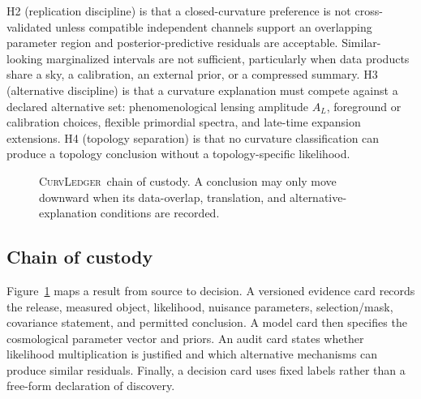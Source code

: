 \documentclass[conference]{IEEEtran}
\newcommand{\ok}{\ensuremath{\Omega_K}}
\newcommand{\curvledger}{\textsc{CurvLedger}}
\begin{document}
H2 (replication discipline) is that a closed-curvature preference is not cross-validated unless compatible independent channels support an overlapping parameter region and posterior-predictive residuals are acceptable. Similar-looking marginalized intervals are not sufficient, particularly when data products share a sky, a calibration, an external prior, or a compressed summary. H3 (alternative discipline) is that a curvature explanation must compete against a declared alternative set: phenomenological lensing amplitude $A_L$, foreground or calibration choices, flexible primordial spectra, and late-time expansion extensions. H4 (topology separation) is that no curvature classification can produce a topology conclusion without a topology-specific likelihood.

\begin{figure}[t]
\centering
{}
\caption{\curvledger\ chain of custody. A conclusion may only move downward when its data-overlap, translation, and alternative-explanation conditions are recorded.}
\label{fig:ledger}
\end{figure}

\subsection{Chain of custody}

Figure~\ref{fig:ledger} maps a result from source to decision. A versioned evidence card records the release, measured object, likelihood, nuisance parameters, selection/mask, covariance statement, and permitted conclusion. A model card then specifies the cosmological parameter vector and priors. An audit card states whether likelihood multiplication is justified and which alternative mechanisms can produce similar residuals. Finally, a decision card uses fixed labels rather than a free-form declaration of discovery.
\end{document}

